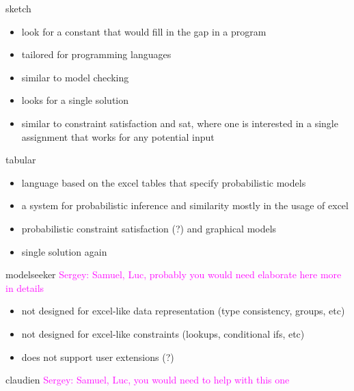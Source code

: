 \documentclass{ecai}
\newcommand{\sergey}[1]{\textcolor{magenta}{{\sc Sergey:} #1}\xspace}
\begin{document}
sketch \cite{sketch}
\begin{itemize}
  \item look for a constant that would fill in the gap in a program
  \item tailored for programming languages
  \item similar to model checking
  \item looks for a single solution
  \item similar to constraint satisfaction and sat, where one is interested in a single assignment that works for any potential input
\end{itemize}

tabular \cite{tabular}
\begin{itemize}
  \item language based on the excel tables that specify probabilistic models
  \item a system for probabilistic inference and similarity mostly in the usage of excel
  \item probabilistic constraint satisfaction (?) and graphical models
  \item single solution again
\end{itemize}

modelseeker \cite{modelseeker} \sergey{Samuel, Luc, probably you would need elaborate here more in details}

\begin{itemize}
  \item not designed for excel-like data representation (type consistency, groups, etc)
  \item not designed for excel-like constraints (lookups, conditional ifs, etc)
  \item does not support user extensions (?)
\end{itemize}

claudien \cite{claudien} \sergey{Samuel, Luc, you would need to help with this one}



\end{document}
